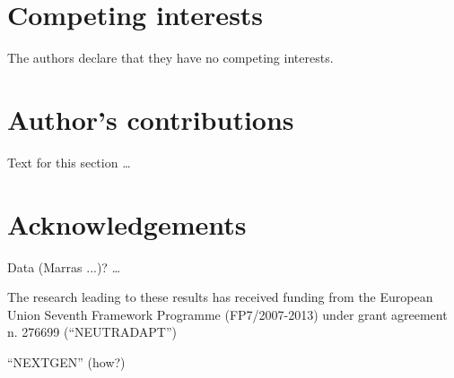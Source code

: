 \documentclass{bmcart}
\begin{document}
\begin{backmatter}

\section*{Competing interests}
  The authors declare that they have no competing interests.

\section*{Author's contributions}
    Text for this section \ldots

\section*{Acknowledgements}
  Data (Marras ...)? \ldots

The research leading to these results has received funding from the European
Union Seventh Framework Programme (FP7/2007-2013) under grant agreement
n. 276699 (``NEUTRADAPT'')

``NEXTGEN'' (how?)






\end{backmatter}
\end{document}
